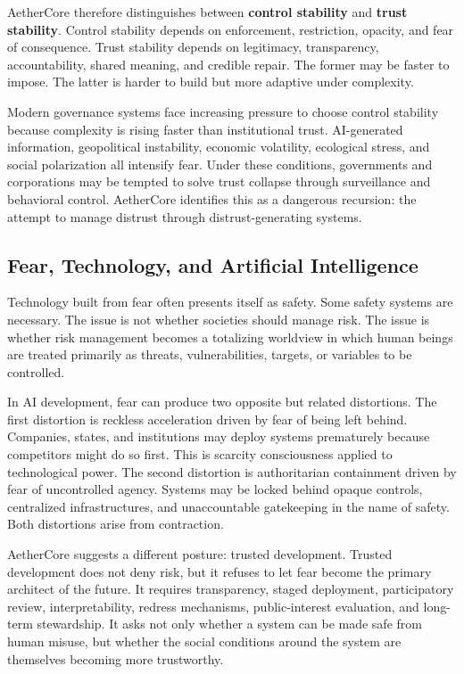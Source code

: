 \documentclass[12pt]{article}
\begin{document}
AetherCore therefore distinguishes between \textbf{control stability} and \textbf{trust stability}. Control stability depends on enforcement, restriction, opacity, and fear of consequence. Trust stability depends on legitimacy, transparency, accountability, shared meaning, and credible repair. The former may be faster to impose. The latter is harder to build but more adaptive under complexity.

Modern governance systems face increasing pressure to choose control stability because complexity is rising faster than institutional trust. AI-generated information, geopolitical instability, economic volatility, ecological stress, and social polarization all intensify fear. Under these conditions, governments and corporations may be tempted to solve trust collapse through surveillance and behavioral control. AetherCore identifies this as a dangerous recursion: the attempt to manage distrust through distrust-generating systems.

\subsection{Fear, Technology, and Artificial Intelligence}

Technology built from fear often presents itself as safety. Some safety systems are necessary. The issue is not whether societies should manage risk. The issue is whether risk management becomes a totalizing worldview in which human beings are treated primarily as threats, vulnerabilities, targets, or variables to be controlled.

In AI development, fear can produce two opposite but related distortions. The first distortion is reckless acceleration driven by fear of being left behind. Companies, states, and institutions may deploy systems prematurely because competitors might do so first. This is scarcity consciousness applied to technological power. The second distortion is authoritarian containment driven by fear of uncontrolled agency. Systems may be locked behind opaque controls, centralized infrastructures, and unaccountable gatekeeping in the name of safety. Both distortions arise from contraction.

AetherCore suggests a different posture: trusted development. Trusted development does not deny risk, but it refuses to let fear become the primary architect of the future. It requires transparency, staged deployment, participatory review, interpretability, redress mechanisms, public-interest evaluation, and long-term stewardship. It asks not only whether a system can be made safe from human misuse, but whether the social conditions around the system are themselves becoming more trustworthy.
\end{document}
